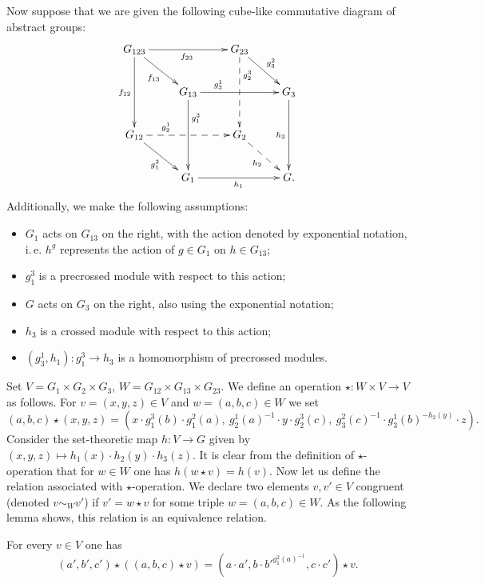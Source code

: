 Now suppose that we are given the following cube-like commutative diagram of abstract groups:
\begin{equation} \label{eq:cube} \begin{split} \xymatrix{
    G_{123} \ar[rr]_{f_{23}} \ar[dd]_{f_{12}} \ar[rd]_{f_{13}} &                        & G_{23} \ar@{-->}[dd]^(.3){g_2^3} \ar[rd]^{g^2_3} &           \\
    & G_{13} \ar[rr]^(.3){g^1_3} \ar^(.3){g^3_1}[dd] &                   & G_3 \ar[dd]_{h_3} \\
    G_{12} \ar@{-->}[rr]^(.3){g_2^1} \ar[rd]_{g_1^2}          &                        & G_2 \ar@{-->}[rd]_{h_2}         &           \\
    & G_1 \ar[rr]_{h_1}              &                   & G.} \end{split} \end{equation}
Additionally, we make the following assumptions:
\begin{itemize}
    \item $G_1$ acts on $G_{13}$ on the right, with the action denoted by exponential notation, i.\,e. $h^g$ represents the action of $g \in G_1$ on $h \in G_{13}$;
    \item $g_1^3$ is a precrossed module with respect to this action;
    \item $G$ acts on $G_3$ on the right, also using the exponential notation;
    \item $h_3$ is a crossed module with respect to this action;
    \item $(g_3^1, h_1) \colon g_1^3 \to h_3$ is a homomorphism of precrossed modules.
\end{itemize}
Set $V = G_1 \times G_2 \times G_3$, $W = G_{12} \times G_{13} \times G_{23}$.
We define an operation $\star \colon W \times V \to V$ as follows.
For $v = (x, y, z) \in V$ and $w = (a, b, c) \in W$ we set
\[(a, b, c) \star (x, y, z) = (x \cdot g_1^3(b) \cdot g_1^2(a),\ g_2^1(a)^{-1} \cdot y \cdot g_2^3(c),\ g_3^2(c)^{-1} \cdot g_3^1(b)^{-h_2(y)} \cdot z).\]
Consider the set-theoretic map $h \colon V \to G$ given by $(x, y, z) \mapsto h_1(x) \cdot h_2(y) \cdot h_3(z)$.
It is clear from the definition of $\star$-operation that for $w \in W$ one has $h(w \star v) = h(v).$
Now let us define the relation associated with $\star$-operation.
We declare two elements $v, v' \in V$ congruent (denoted $v \sim_W v'$) if $v' = w \star v$ for some triple $w=(a, b, c) \in W$.
As the following lemma shows, this relation is an equivalence relation.
\begin{lemma} For every $v \in V$ one has
\begin{equation*}(a', b', c') \star \left( (a, b, c) \star v \right) = (a \cdot a', b \cdot {b'}^{g_1^2(a)^{-1}}, c \cdot c') \star v.\end{equation*}
\end{lemma}
